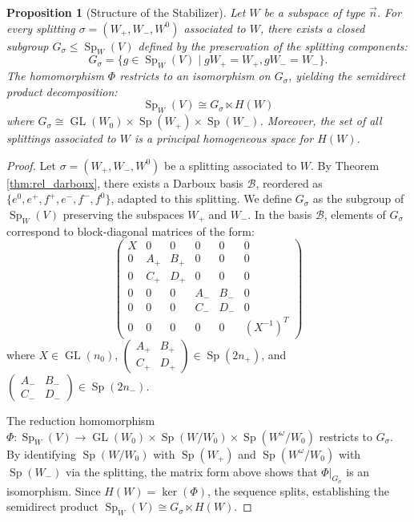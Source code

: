 \documentclass[12pt, final]{article}
\def\Sp{\operatorname{Sp}}
\def\GL{\operatorname{GL}}
\newtheorem{proposition}[theorem]{Proposition}
\begin{document}
\begin{proposition}[Structure of the Stabilizer] \label{prop:stabilizer}
Let $W$ be a subspace of type $\vec{n}$. For every splitting $\sigma = (W_+, W_-, W^0)$ associated to $W$, there exists a closed subgroup $G_\sigma \le \Sp_W(V)$ defined by the preservation of the splitting components:
\[
G_\sigma = \{ g \in \Sp_W(V) \mid gW_+ = W_+, gW_- = W_- \}.
\]
The homomorphism $\Phi$ restricts to an isomorphism on $G_\sigma$, yielding the semidirect product decomposition:
\[
\Sp_W(V) \cong G_\sigma \ltimes H(W)
\]
where $G_\sigma \cong \GL(W_0) \times \Sp(W_+) \times \Sp(W_-)$. Moreover, the set of all splittings associated to $W$ is a principal homogeneous space for $H(W)$.
\end{proposition}

\begin{proof}
Let $\sigma = (W_+, W_-, W^0)$ be a splitting associated to $W$. By Theorem \ref{thm:rel_darboux}, there exists a Darboux basis $\mathcal{B}$, reordered as $\{e^0, e^+, f^+, e^-, f^-, f^0\}$, adapted to this splitting. We define $G_\sigma$ as the subgroup of $\Sp_W(V)$ preserving the subspaces $W_+$ and $W_-$. In the basis $\mathcal{B}$, elements of $G_\sigma$ correspond to block-diagonal matrices of the form:
\[
\begin{pmatrix}
X & 0 & 0 & 0 & 0 & 0 \\
0 & A_+ & B_+ & 0 & 0 & 0 \\
0 & C_+ & D_+ & 0 & 0 & 0 \\
0 & 0 & 0 & A_- & B_- & 0 \\
0 & 0 & 0 & C_- & D_- & 0 \\
0 & 0 & 0 & 0 & 0 & (X^{-1})^T
\end{pmatrix}
\]
where $X \in \GL(n_0)$, $\left(\begin{smallmatrix} A_+ & B_+ \\ C_+ & D_+ \end{smallmatrix}\right) \in \Sp(2n_+)$, and $\left(\begin{smallmatrix} A_- & B_- \\ C_- & D_- \end{smallmatrix}\right) \in \Sp(2n_-)$.

The reduction homomorphism $\Phi: \Sp_W(V) \to \GL(W_0) \times \Sp(W/W_0) \times \Sp(W^\omega/W_0)$ restricts to $G_\sigma$. By identifying $\Sp(W/W_0)$ with $\Sp(W_+)$ and $\Sp(W^\omega/W_0)$ with $\Sp(W_-)$ via the splitting, the matrix form above shows that $\Phi|_{G_\sigma}$ is an isomorphism. Since $H(W) = \ker(\Phi)$, the sequence splits, establishing the semidirect product $\Sp_W(V) \cong G_\sigma \ltimes H(W)$.


\end{proof}
\end{document}
